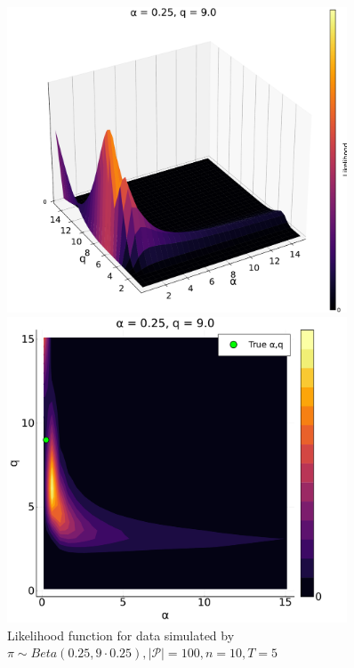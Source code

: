 \documentclass[a4paper, 12pt]{article}
\begin{document}
\begin{figure}
    \centering
    \begin{minipage}{0.55\textwidth}
        \centering
        \includegraphics[width=0.9\textwidth]{../figures/Likelihood_sfplt_0.25.pdf} %
    \end{minipage}\hfill
    \begin{minipage}{0.45\textwidth}
        \centering
        \includegraphics[width=0.9\textwidth]{../figures/Likelihood_contplt_0.25.pdf} %
    \end{minipage}
    \caption{\small Likelihood function for data simulated by $\pi \sim Beta(0.25, 9 \cdot 0.25), |\mathcal{P}| = 100, n = 10, T = 5$}
\end{figure}
\end{document}
